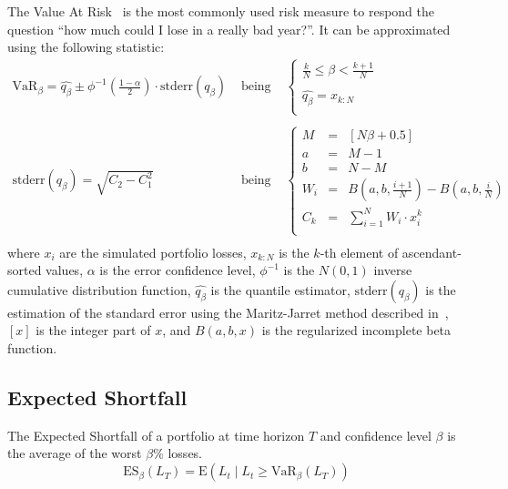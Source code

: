 \documentclass[11pt,fleqn]{book} %
\begin{document}
The Value At Risk~\cite{var:jorion} is the most commonly 
used risk measure to respond the question \enquote{how much could I lose in a 
really bad year?}. It can be approximated using the following statistic:
\begin{displaymath}
	\begin{array}{lcl}
		\textrm{VaR}_{\beta} = \widehat{q_{\beta}} \pm \phi^{-1}\left(\frac{1-\alpha}{2}\right) \cdot \textrm{stderr}(q_{\beta})
		& \text{ being } &
		\left\{
		\begin{array}{l}
			\displaystyle
			\frac{k}{N} \leq \beta < \frac{k+1}{N} \\
			\\
			\displaystyle
			\widehat{q_{\beta}} = x_{k:N} \\
		\end{array}
		\right.
		\\
		& &
		\\
		\textrm{stderr}(q_{\beta}) = \sqrt{C_2 - C_1^2}
		& \text{ being } &
		\left\{
		\begin{array}{rcl}
			M   & = & [N \beta + 0.5]  \\
			a   & = & M - 1            \\
			b   & = & N - M            \\
			W_i & = & B(a,b,\frac{i+1}{N}) - B(a,b,\frac{i}{N}) \\
			C_k & = & \sum_{i=1}^{N} W_i \cdot x_i^k \\
		\end{array}
		\right.
		\\
	\end{array}
\end{displaymath}
where $x_i$ are the simulated portfolio losses, $x_{k:N}$ is the $k$-th 
element of ascendant-sorted values, $\alpha$ is the error confidence level, 
$\phi^{-1}$ is the $N(0,1)$ inverse cumulative distribution function, 
$\widehat{q_{\beta}}$ is the quantile estimator, $\textrm{stderr}(q_{\beta})$ 
is the estimation of the standard error using the Maritz-Jarret method 
described in~\cite{quant:algor}, $[x]$ is the integer part of $x$, and 
$B(a,b,x)$ is the regularized incomplete beta function.

\subsection{Expected Shortfall}

\begin{definition}
	The Expected Shortfall of a portfolio at time horizon $T$ and 
	confidence level $\beta$ is the average of the worst $\beta\%$ losses.
	\begin{displaymath}
		\text{ES}_\beta(L_T) = \text{E}(L_t \mid L_t \ge \text{VaR}_\beta(L_T))
	\end{displaymath}
\end{definition}
\end{document}
